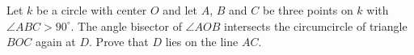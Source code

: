Let $k$ be a circle with center $O$ and let $A$,
$B$ and $C$ be three points on $k$ with $\angle ABC > 90^\circ$.
The angle bisector of $\angle AOB$ intersects the circumcircle of triangle $BOC$ again at $D$.
Prove that $D$ lies on the line $AC$. 
